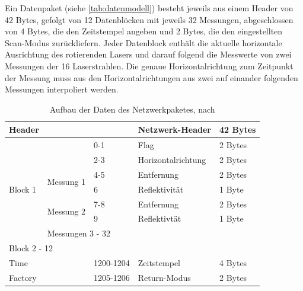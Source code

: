\documentclass[a4paper,12pt,bibliography=totoc, listof=totoc,titlepage,pointlessnumbers]{scrreprt}
\begin{document}
Ein Datenpaket (siehe \autoref{tab:datenmodell}) besteht jeweils aus einem Header von 42 Bytes, gefolgt von 12 Datenblöcken mit jeweils 32 Messungen, abgeschlossen von 4 Bytes, die den Zeitstempel angeben und 2 Bytes, die den eingestellten Scan-Modus zurückliefern. Jeder Datenblock enthält die aktuelle horizontale Ausrichtung des rotierenden Lasers und darauf folgend die Messwerte von zwei Messungen der 16 Laserstrahlen. Die genaue Horizontalrichtung zum Zeitpunkt der Messung muss aus den Horizontalrichtungen aus zwei auf einander folgenden Messungen interpoliert werden.

\begin{table}
\centering
\begin{tabular}{|lll|l|l|}
\hline
Header                                         &                                 
                &           & Netzwerk-Header  & 42 Bytes \\ \hline
\multicolumn{1}{|l|}{\multirow{7}{*}{Block 1}} &                                 
                & 0-1       & Flag             & 2 Bytes  \\ \cline{2-5} 
\multicolumn{1}{|l|}{}                         &                                 
                & 2-3       & Horizontalrichtung & 2 Bytes  \\ \cline{2-5} 
\multicolumn{1}{|l|}{}                         & 
\multicolumn{1}{l|}{\multirow{2}{*}{Messung 1}} & 4-5       & Entfernung       & 
2 Bytes  \\ \cline{3-5} 
\multicolumn{1}{|l|}{}                         & \multicolumn{1}{l|}{}           
                & 6         & Reflektivität    & 1 Byte   \\ \cline{2-5} 
\multicolumn{1}{|l|}{}                         & 
\multicolumn{1}{l|}{\multirow{2}{*}{Messung 2}} & 7-8       & Entfernung       & 
2 Bytes  \\ \cline{3-5} 
\multicolumn{1}{|l|}{}                         & \multicolumn{1}{l|}{}           
                & 9         & Reflektivtät     & 1 Byte   \\ \cline{2-5} 
\multicolumn{1}{|l|}{}                         & \multicolumn{4}{l|}{Messungen 3 
- 32}                                                     \\ \hline
\multicolumn{5}{|l|}{Block 2 - 12}                                               
                                                          \\ \hline
Time                                           & \multicolumn{1}{l|}{}           
                & 1200-1204 & Zeitstempel      & 4 Bytes  \\ \hline
Factory                                        & \multicolumn{1}{l|}{}           
                & 1205-1206 & Return-Modus     & 2 Bytes  \\ \hline
\end{tabular}

\caption{Aufbau der Daten des Netzwerkpaketes, nach \citet{vlpManual}}
\label{tab:datenmodell}
\end{table}
\end{document}
